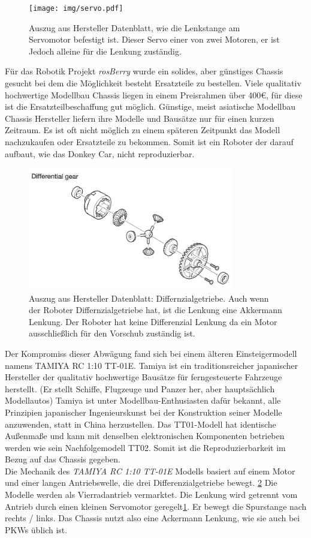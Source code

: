 \documentclass[conference]{IEEEtran}
\begin{document}
	\begin{figure}[h]
		\centering
		\texttt{[image: img/servo.pdf]}
		\caption{Auszug aus Hersteller Datenblatt, wie die Lenkstange am 
		Servomotor  befestigt ist. Dieser Servo einer von zwei Motoren, er  ist 
		Jedoch alleine für die Lenkung zuständig. }
		\label{Servomotor}
	\end{figure}
	Für das Robotik Projekt \textit{rosBerry} wurde ein solides, aber günstiges Chassis gesucht bei dem die Möglichkeit besteht Ersatzteile zu bestellen. Viele qualitativ hochwertige Modellbau Chassis liegen in einem Preisrahmen über 400€, für diese ist die Ersatzteilbeschaffung gut möglich. Günstige, meist asiatische Modellbau Chassis Hersteller liefern ihre Modelle und Bausätze nur für einen kurzen Zeitraum. Es ist oft nicht möglich zu einem späteren Zeitpunkt das Modell nachzukaufen oder Ersatzteile zu bekommen. Somit ist ein Roboter der darauf aufbaut, wie das Donkey Car, nicht reproduzierbar. 
	\\
	\begin{figure} %
		\centering
		\includegraphics[width=9cm]{img/geer.png}
		\caption{Auszug aus Hersteller Datenblatt: Differnzialgetriebe. Auch 
		wenn der Roboter Differnzialgetriebe hat, ist die Lenkung eine 
		Akkermann Lenkung. Der Roboter hat keine Differenzial Lenkung da 
		ein Motor ausschließlich für den Vorschub zuständig ist. }
		\label{Getriebe}
	\end{figure}
	Der Kompromiss dieser Abwägung fand sich bei einem älteren 
	Einsteigermodell namens TAMIYA RC 1:10 TT-01E. Tamiya ist ein 
	traditionsreicher japanischer Hersteller der qualitativ hochwertige 
	Bausätze für ferngesteuerte Fahrzeuge herstellt. (Er stellt Schiffe, Flugzeuge 
	und Panzer her, aber hauptsächlich Modellautos) Tamiya ist unter 
	Modellbau-Enthusiasten dafür bekannt, alle Prinzipien japanischer 
	Ingenieurskunst bei der Konstruktion seiner Modelle anzuwenden, statt 
	 in China herzustellen. Das TT01-Modell hat 
	identische Außenmaße und kann mit denselben elektronischen Komponenten 
	betrieben werden wie sein Nachfolgemodell TT02. Somit ist die 
	Reproduzierbarkeit im Bezug auf das Chassis gegeben.
	\\
	Die Mechanik des \textit{TAMIYA RC 1:10 TT-01E } Modells basiert auf 
	einem Motor und einer langen Antriebswelle, die drei Differenzialgetriebe 
	bewegt. \ref{Getriebe} Die Modelle werden als Vierradantrieb vermarktet. 
	Die Lenkung wird getrennt vom Antrieb durch einen kleinen Servomotor 
	geregelt\ref{Servomotor}. Er bewegt die Spurstange nach rechts / links. Das 
	Chassis nutzt also eine Ackermann Lenkung, wie sie auch bei PKWs üblich ist.
	
\end{document}
